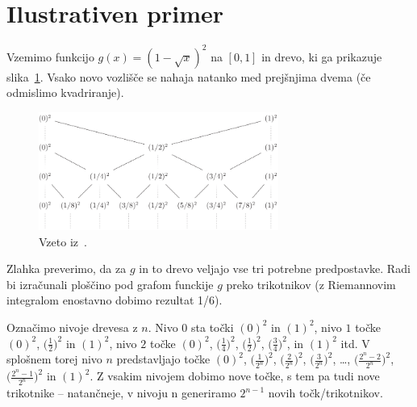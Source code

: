 \documentclass[a4paper, 12pt, titlepage]{article}
\begin{document}
\section{Ilustrativen primer} \label{ilustrativen_primer}

Vzemimo funkcijo $ g(x) = (1 - \sqrt{x})^2 $ na $ [0, 1] $ in drevo, ki ga prikazuje slika~\ref{ilustrativen_primer_drevo}. Vsako novo vozlišče se nahaja natanko med prejšnjima dvema (če odmislimo kvadriranje).

\begin{figure}[h!]
    \centering
    \includegraphics[width=0.7\textwidth]{slike/ilustrativen_primer_drevo.png}
    \caption{Vzeto iz~\cite{osnovni_clanek}.}
    \label{ilustrativen_primer_drevo}
\end{figure}

Zlahka preverimo, da za $ g $ in to drevo veljajo vse tri potrebne predpostavke. Radi bi izračunali ploščino pod grafom funckije $ g $ preko trikotnikov (z Riemannovim integralom enostavno dobimo rezultat 1/6).

Označimo nivoje drevesa z $ n $. Nivo $ 0 $ sta točki $ (0)^2 $ in $ (1)^2 $, nivo $ 1 $ točke $ (0)^2 $, $ \bigl(\frac{1}{2}\bigr)^2 $ in $ (1)^2 $, nivo $ 2 $ točke $ (0)^2 $, $ \bigl(\frac{1}{4}\bigr)^2 $, $ \bigl(\frac{1}{2}\bigr)^2 $, $ \bigl(\frac{3}{4}\bigr)^2 $, in $ (1)^2 $ itd. V splošnem torej nivo $ n $ predstavljajo točke $ (0)^2 $, $ \bigl(\frac{1}{2^n}\bigr)^2 $, $ \bigl(\frac{2}{2^n}\bigr)^2 $, $ \bigl(\frac{3}{2^n}\bigr)^2 $, \ldots, $ \bigl(\frac{2^n-2}{2^n}\bigr)^2 $, $ \bigl(\frac{2^n-1}{2^n}\bigr)^2 $ in $ (1)^2 $. Z vsakim nivojem dobimo nove točke, s tem pa tudi nove trikotnike -- natančneje, v nivoju n generiramo $ 2^{n-1} $ novih točk/trikotnikov.
\end{document}

